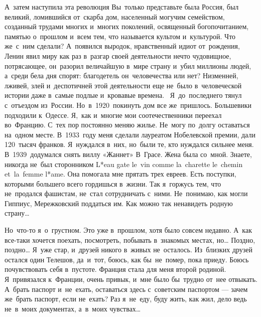 А~затем наступила эта революция Вы~только представьте была Россия, был великий, ломившийся от~скарба дом, населенный могучим семейством, созданный трудами многих и~многих поколений, освященный богопочитанием, памятью о~прошлом и~всем тем, что называется культом и~культурой.
Что же~с~ним сделали? А~появился выродок, нравственный идиот от~рождения, Ленин явил миру как раз в~разгар своей деятельности нечто чудовищное, потрясающее, он~разорил величайшую в~мире страну и~убил миллионы людей, а~среди бела дня спорят: благодетель он~человечества или нет? Низменней, лживей, злей и~деспотичней этой деятельности еще не~было в~человеческой истории даже в~самые подлые и~кровавые времена.
~Я~до~последнего тянул с~отъездом из~России.
Но~в~1920~покинуть дом все же~пришлось.
Большевики подходили к~Одессе.
Я,~как и~многие мои соотечественники переехал во~Францию.
С~тех пор постоянно меняю жилье.
Не~могу по~долгу оставаться на~одном месте.
В~1933~году меня сделали лауреатом Нобелевской премии, дали 120~тысяч франков.
Я~нуждался в~них, но~были те, кто нуждался сильнее меня.
В~1939~додумался снять виллу «Жаннет» В~Грасе.
Жена была со~мной.
Знаете, никогда не~был сторонником L*eau gate le~vin comme la~charette le~chemin et~la~femme l*ame.
Она помогала мне прятать трех евреев.
Есть поступки, которыми большего всего гордишься в~жизни.
Так я~горжусь тем, что не~продался фашистам, не~стал сотрудничать с~ними.
Не~понимаю, как могли Гиппиус, Мережковский поддаться им.
Как можно так ненавидеть родную страну…
 
Но~что-то я~о~грустном.
Это уже в~прошлом, хотя было совсем недавно.
А~как все-таки хочется поехать, посмотреть, побывать в~знакомых местах, но… Поздно, поздно… Я~уже стар, и~друзей никого в~живых не~осталось.
Из~близких друзей остался один Телешов, да~и~тот, боюсь, как бы~не~помер, пока приеду.
Боюсь почувствовать себя в~пустоте.
Франция стала для меня второй родиной.
Я~привязался к~Франции, очень привык, и~мне было бы~трудно от~нее отвыкать.
А~брать паспорт и~не~ехать, оставаться здесь с~советским паспортом --- зачем же~брать паспорт, если не~ехать? Раз я~не~еду, буду жить, как жил, дело ведь не~в~моих документах, а~в~моих чувствах… 
